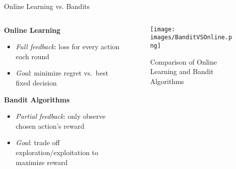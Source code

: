 \documentclass{beamer}
\begin{document}



\begin{frame}{Online Learning vs. Bandits}
  \begin{columns}[T]
    \begin{column}{0.6\textwidth}
      \textbf{Online Learning}
      \begin{itemize}
        \item \emph{Full feedback}: loss for every action each round
        \item \emph{Goal}: minimize regret vs.\ best fixed decision
      \end{itemize}
      \vspace{1em}
      \textbf{Bandit Algorithms}
      \begin{itemize}
        \item \emph{Partial feedback}: only observe chosen action’s reward
        \item \emph{Goal}: trade off exploration/exploitation to maximize reward
      \end{itemize}
    \end{column}
    \begin{column}{0.4\textwidth}
      \begin{figure}
        \centering
        \texttt{[image: images/BanditVSOnline.png]}
        \caption{Comparison of Online Learning and Bandit Algorithms}
      \end{figure}
    \end{column}
  \end{columns}
\end{frame}
\end{document}
